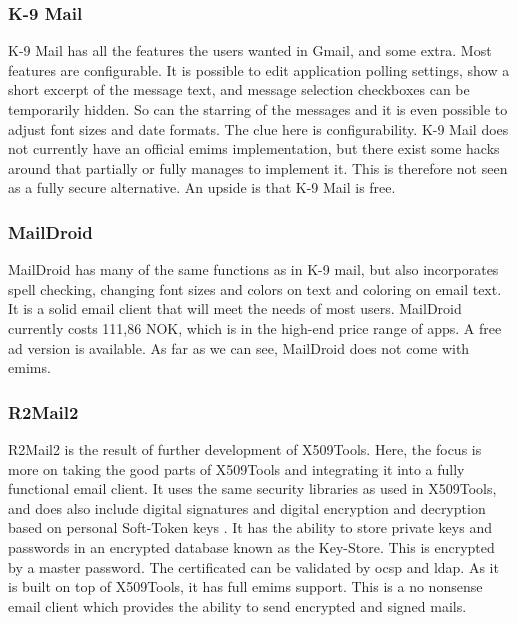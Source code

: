 \subsubsection{K-9 Mail}
K-9 Mail has all the features the users wanted in Gmail, and some extra. Most features are configurable. It is possible to edit application polling settings, show a short excerpt of the message text, and message selection checkboxes can be temporarily hidden. So can the starring of the messages and it is even possible to adjust font sizes and date formats. The clue here is configurability. K-9 Mail does not currently have an official \gls{emims} implementation, but there exist some hacks around that partially or fully manages to implement it. This is therefore not seen as a fully secure alternative. An upside is that K-9 Mail is free.

\subsubsection{MailDroid}
MailDroid has many of the same functions as in K-9 mail, but also incorporates spell checking, changing font sizes and colors on text and coloring on email text. It is a solid email client that will meet the needs of most users. MailDroid currently costs 111,86 NOK, which is in the high-end price range of apps. A free ad version is available. As far as we can see, MailDroid does not come with \gls{emims}. 

\subsubsection{R2Mail2}
R2Mail2 is the result of further development of X509Tools. Here, the focus is more on taking the good parts of X509Tools and integrating it into a fully functional email client. It uses the same security libraries as used in X509Tools, and does also include digital signatures and digital encryption and decryption based on personal Soft-Token keys \cite{bib:r2mail2}. It has the ability to store private keys and passwords in an encrypted database known as the Key-Store. This is encrypted by a master password. The certificated can be validated by \gls{ocsp} and \gls{ldap}. As it is built on top of X509Tools, it has full \gls{emims} support. This is a no nonsense email client which provides the ability to send encrypted and signed mails.


